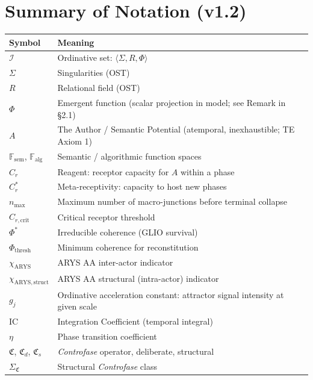 \documentclass[12pt,a4paper]{article}
\newcommand{\reag}{C_r}
\newcommand{\reagcrit}{C_{r,\mathrm{crit}}}
\newcommand{\reagmeta}{C_r^{*}}
\newcommand{\gj}{g_j}
\newcommand{\IC}{\mathrm{IC}}
\newcommand{\Phistar}{\Phi^{*}}
\newcommand{\Phithresh}{\Phi_{\mathrm{thresh}}}
\newcommand{\Mpot}{A}
\newcommand{\Fsem}{\mathbb{F}_{\mathrm{sem}}}
\newcommand{\Falg}{\mathbb{F}_{\mathrm{alg}}}
\newcommand{\nmax}{n_{\mathrm{max}}}
\newcommand{\CF}{\mathfrak{C}}           %
\newcommand{\CFd}{\mathfrak{C}_d}        %
\newcommand{\CFs}{\mathfrak{C}_s}        %
\newcommand{\SigmaCF}{\Sigma_{\mathfrak{C}}}  %
\begin{document}

\appendix

\section{Summary of Notation (v1.2)}\label{app:notation}

\begin{table}[H]
\centering
\begin{tabular}{@{}lp{9cm}@{}}
\toprule
\textbf{Symbol} & \textbf{Meaning} \\
\midrule
$\mathcal{I}$ & Ordinative set: $\langle \Sigma, R, \Phi \rangle$ \\
$\Sigma$ & Singularities (OST) \\
$R$ & Relational field (OST) \\
$\Phi$ & Emergent function (scalar projection in model; see Remark in \S2.1) \\
$\Mpot$ & The Author / Semantic Potential (atemporal, inexhaustible; TE Axiom 1) \\
$\Fsem$, $\Falg$ & Semantic / algorithmic function spaces \\
$\reag$ & Reagent: receptor capacity for $\Mpot$ within a phase \\
$\reagmeta$ & Meta-receptivity: capacity to host new phases \\
$\nmax$ & Maximum number of macro-junctions before terminal collapse \\
$\reagcrit$ & Critical receptor threshold \\
$\Phistar$ & Irreducible coherence (GLIO survival) \\
$\Phithresh$ & Minimum coherence for reconstitution \\
$\chi_{\mathrm{ARYS}}$ & ARYS AA inter-actor indicator \\
$\chi_{\mathrm{ARYS,struct}}$ & ARYS AA structural (intra-actor) indicator \\
$\gj$ & Ordinative acceleration constant: attractor signal intensity at given scale \\
$\IC$ & Integration Coefficient (temporal integral) \\
$\eta$ & Phase transition coefficient \\
$\CF$, $\CFd$, $\CFs$ & \textit{Controfase} operator, deliberate, structural \\
$\SigmaCF$ & Structural \textit{Controfase} class \\

\end{tabular}
\end{table}
\end{document}
